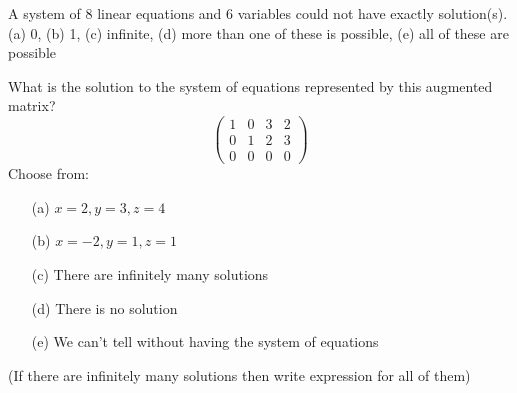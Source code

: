 \begin{problem}
    A system of 8 linear equations and 6 variables could not have exactly
    \underline{\hspace{0.5in}} solution(s).  \\ (a) 0, \quad (b) 1, \quad (c) infinite, \quad
    (d) more than one of these is possible, \quad (e) all of these are possible
\end{problem}
%             
% 
% 
%             
% 
% 
\begin{problem}
    What is the solution to the system of equations represented by this augmented matrix?
    \[ \left( \begin{array}{ccc|c} 1 & 0 & 3 & 2 \\ 0 & 1 & 2 & 3 \\ 0 & 0 & 0 & 0
        \end{array} \right) \]
    Choose from:
    \begin{enumerate}
        \item[(a)] $x=2, y=3, z=4$
        \item[(b)] $x=-2, y=1, z=1$
        \item[(c)] There are infinitely many solutions
        \item[(d)] There is no solution
        \item[(e)] We can't tell without having the system of equations
    \end{enumerate}
    (If there are infinitely many solutions then write expression for all of them)
\end{problem}

